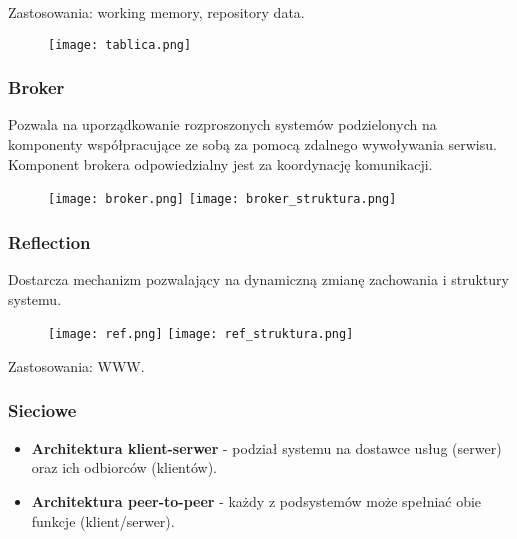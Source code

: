 \documentclass[a4paper]{article}
\begin{document}
    Zastosowania: working memory, repository data.

    \begin{figure}[h]
        \texttt{[image: tablica.png]}
    \end{figure}



    \subsubsection{Broker}
    Pozwala na uporządkowanie rozproszonych systemów podzielonych na komponenty współpracujące ze sobą za pomocą zdalnego wywoływania
    serwisu. Komponent brokera odpowiedzialny jest za koordynację komunikacji.

    \begin{figure}[h]
        \texttt{[image: broker.png]}
        \texttt{[image: broker\_struktura.png]}
    \end{figure}

    \subsubsection{Reflection}
    Dostarcza mechanizm pozwalający na dynamiczną zmianę zachowania i struktury systemu.
    \begin{figure}[h]
        \texttt{[image: ref.png]}
        \texttt{[image: ref\_struktura.png]}
    \end{figure}

    Zastosowania: WWW.

    \subsubsection{Sieciowe}
    \begin{itemize}
        \item \textbf{Architektura klient-serwer} - podział systemu na dostawce usług (serwer) oraz ich odbiorców (klientów).
        \item \textbf{Architektura peer-to-peer} - każdy z podsystemów może spełniać obie funkcje (klient/serwer).

    \end{itemize}
\end{document}
